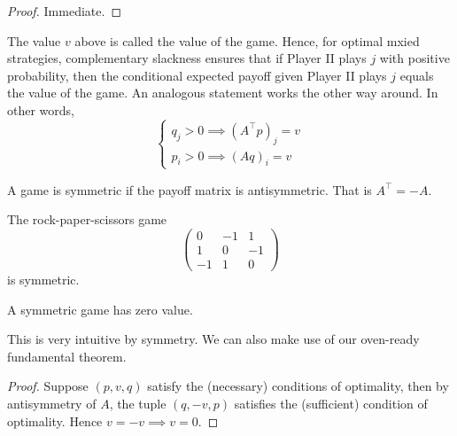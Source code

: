\begin{proof}
    Immediate.
\end{proof}
The value $v$ above is called the value of the game.
Hence, for optimal mxied strategies, complementary slackness ensures that if Player II plays $j$ with positive probability, then the conditional expected payoff given Player II plays $j$ equals the value of the game.
An analogous statement works the other way around.
In other words,
$$\begin{cases}
    q_j>0\implies (A^\top p)_j=v\\
    p_i>0\implies (Aq)_i=v
\end{cases}$$
\begin{definition}
    A game is symmetric if the payoff matrix is antisymmetric.
    That is $A^\top=-A$.
\end{definition}
\begin{example}
    The rock-paper-scissors game
    $$\begin{pmatrix}
        0&-1&1\\
        1&0&-1\\
        -1&1&0
    \end{pmatrix}$$
    is symmetric.
\end{example}
\begin{theorem}
    A symmetric game has zero value.
\end{theorem}
This is very intuitive by symmetry.
We can also make use of our oven-ready fundamental theorem.
\begin{proof}
    Suppose $(p,v,q)$ satisfy the (necessary) conditions of optimality, then by antisymmetry of $A$, the tuple $(q,-v,p)$ satisfies the (sufficient) condition of optimality.
    Hence $v=-v\implies v=0$.
\end{proof}
